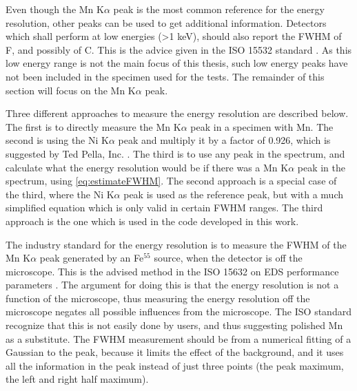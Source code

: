 Even though the Mn K$\alpha$ peak is the most common reference for the energy resolution, other peaks can be used to get additional information.
Detectors which shall perform at low energies (>1 keV), should also report the FWHM of F, and possibly of C.
This is the advice given in the ISO 15532 standard \cite{iso_qc_15632}.
As this low energy range is not the main focus of this thesis, such low energy peaks have not been included in the specimen used for the tests.
The remainder of this section will focus on the Mn K$\alpha$ peak.




Three different approaches to measure the energy resolution are described below.
The first is to directly measure the Mn K$\alpha$ peak in a specimen with Mn.
The second is using the Ni K$\alpha$ peak and multiply it by a factor of 0.926, which is suggested by Ted Pella, Inc. \cite{ted_pella_nio_tem_2019}.
The third is to use any peak in the spectrum, and calculate what the energy resolution would be if there was a Mn K$\alpha$ peak in the spectrum, using \cref{eq:estimateFWHM}.
The second approach is a special case of the third, where the Ni K$\alpha$ peak is used as the reference peak, but with a much simplified equation which is only valid in certain FWHM ranges.
The third approach is the one which is used in the code developed in this work.


The industry standard for the energy resolution is to measure the FWHM of the Mn K$\alpha$ peak generated by an Fe$^{55}$ source, when the detector is off the microscope.
This is the advised method in the ISO 15632 on EDS performance parameters \cite{iso_qc_15632}.
The argument for doing this is that the energy resolution is not a function of the microscope, thus measuring the energy resolution off the microscope negates all possible influences from the microscope.
The ISO standard recognize that this is not easily done by users, and thus suggesting polished Mn as a substitute.
The FWHM measurement should be from a numerical fitting of a Gaussian to the peak, because it limits the effect of the background, and it uses all the information in the peak instead of just three points (the peak maximum, the left and right half maximum).


